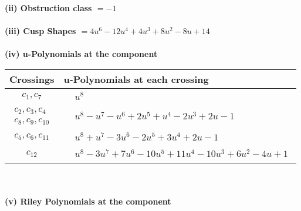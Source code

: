 \documentclass[1p]{elsarticle_modified}
\theoremstyle{definition}
\begin{document}
\flushleft \textbf{(ii) Obstruction class $= -1$}\\~\\
\flushleft \textbf{(iii) Cusp Shapes $= 4 u^6-12 u^4+4 u^3+8 u^2-8 u+14$}\\~\\
\newpage\renewcommand{\arraystretch}{1}
\flushleft \textbf{(iv) u-Polynomials at the component}\newline \\
\begin{tabular}{m{50pt}|m{274pt}}
Crossings & \hspace{64pt}u-Polynomials at each crossing \\
\hline $$\begin{aligned}c_{1},c_{7}\end{aligned}$$&$\begin{aligned}
&u^8
\end{aligned}$\\
\hline $$\begin{aligned}c_{2},c_{3},c_{4}\\c_{8},c_{9},c_{10}\end{aligned}$$&$\begin{aligned}
&u^8- u^7- u^6+2 u^5+u^4-2 u^3+2 u-1
\end{aligned}$\\
\hline $$\begin{aligned}c_{5},c_{6},c_{11}\end{aligned}$$&$\begin{aligned}
&u^8+u^7-3 u^6-2 u^5+3 u^4+2 u-1
\end{aligned}$\\
\hline $$\begin{aligned}c_{12}\end{aligned}$$&$\begin{aligned}
&u^8-3 u^7+7 u^6-10 u^5+11 u^4-10 u^3+6 u^2-4 u+1
\end{aligned}$\\
\hline
\end{tabular}\\~\\
\newpage\renewcommand{\arraystretch}{1}
\flushleft \textbf{(v) Riley Polynomials at the component}\newline \\
\end{document}
